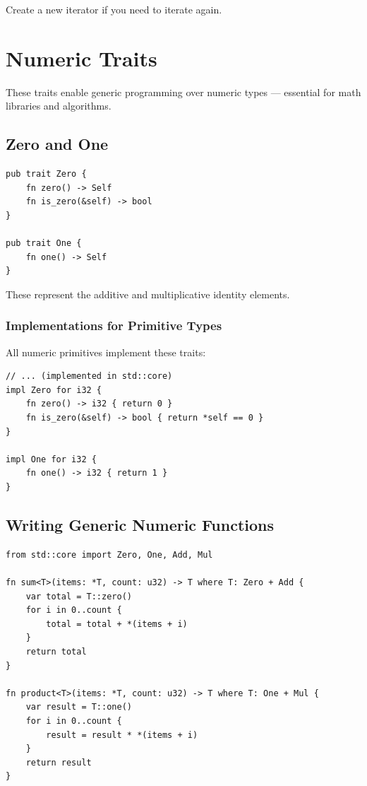 Create a new iterator if you need to iterate again.


\section{Numeric Traits}
\label{sec:numeric-traits}

These traits enable generic programming over numeric types --- essential for math libraries and algorithms.

\subsection{Zero and One}

\begin{lstlisting}
pub trait Zero {
    fn zero() -> Self
    fn is_zero(&self) -> bool
}

pub trait One {
    fn one() -> Self
}
\end{lstlisting}

These represent the additive and multiplicative identity elements.

\subsubsection{Implementations for Primitive Types}

All numeric primitives implement these traits:

\begin{lstlisting}
// ... (implemented in std::core)
impl Zero for i32 {
    fn zero() -> i32 { return 0 }
    fn is_zero(&self) -> bool { return *self == 0 }
}

impl One for i32 {
    fn one() -> i32 { return 1 }
}
\end{lstlisting}

\subsection{Writing Generic Numeric Functions}

\begin{lstlisting}
from std::core import Zero, One, Add, Mul

fn sum<T>(items: *T, count: u32) -> T where T: Zero + Add {
    var total = T::zero()
    for i in 0..count {
        total = total + *(items + i)
    }
    return total
}

fn product<T>(items: *T, count: u32) -> T where T: One + Mul {
    var result = T::one()
    for i in 0..count {
        result = result * *(items + i)
    }
    return result
}
\end{lstlisting}

